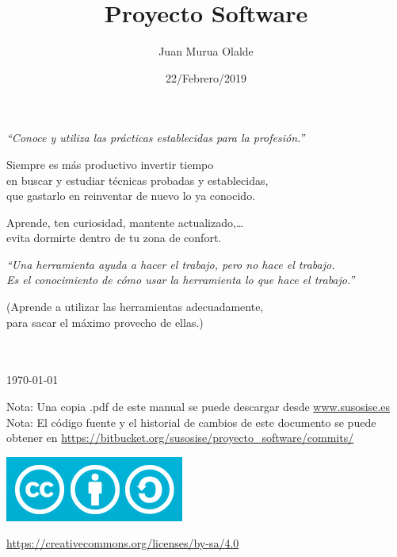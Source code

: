 \documentclass[spanish,12pt,a4paper,final,oneside]{book}
\title{Proyecto Software}
\author{Juan Murua Olalde}
\date{22/Febrero/2019}
\begin{document}
\begin{titlepage}

\begin{flushright}
\vspace{2cm}
\begin{Huge}\MyTitle \end{Huge}
\end{flushright}


\begin{flushleft}
\vspace{0.3cm}
\textit{``Conoce y utiliza las prácticas establecidas para la profesión.''}

\begin{footnotesize}Siempre es más productivo invertir tiempo\\ en buscar y estudiar técnicas probadas y establecidas,\\ que gastarlo en reinventar de nuevo lo ya conocido.

Aprende, ten curiosidad, mantente actualizado,\ldots\\ evita dormirte dentro de tu zona de confort.\end{footnotesize}

\vspace{0.5cm}
\textit{``Una herramienta ayuda a hacer el trabajo, pero no hace el trabajo.\\ Es el conocimiento de cómo usar la herramienta lo que hace el trabajo.''}

\begin{footnotesize}(Aprende a utilizar las herramientas adecuadamente,\\ para sacar el máximo provecho de ellas.)\end{footnotesize}
\end{flushleft}

\begin{flushright}
\vspace{1cm}
\MyAuthor
\\
\vspace{1cm}
\MyDate
\\ \today
\end{flushright}

\vfill
Nota: Una copia .pdf de este manual se puede descargar desde \url{www.susosise.es}
\\Nota: El código fuente y el historial de cambios de este documento se puede obtener en \url{https://bitbucket.org/susosise/proyecto_software/commits/}
\begin{flushleft}
\includegraphics[scale=0.3]{CreativeCommons-Attribution-ShareAlike-logo}
\begin{small}\url{https://creativecommons.org/licenses/by-sa/4.0}\end{small}
\end{flushleft}

\end{titlepage}
\end{document}
